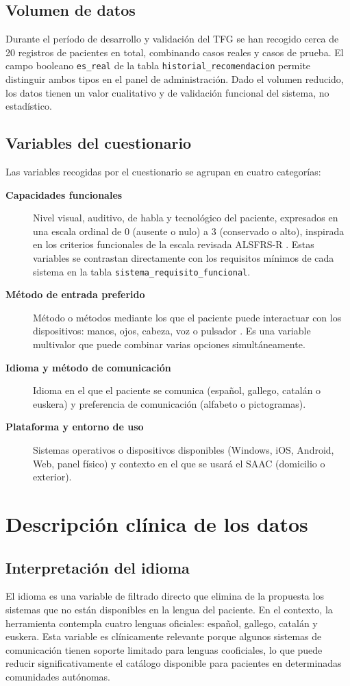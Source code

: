 \subsection{Volumen de datos}
Durante el período de desarrollo y validación del TFG se han recogido cerca de 20 registros de pacientes en total, combinando casos reales y casos de prueba. El campo booleano \texttt{es\_real} de la tabla \texttt{historial\_recomendacion} permite distinguir ambos tipos en el panel de administración. Dado el volumen reducido, los datos tienen un valor cualitativo y de validación funcional del sistema, no estadístico.

\subsection{Variables del cuestionario}
Las variables recogidas por el cuestionario se agrupan en cuatro categorías:

\begin{description}
	\item[\textbf{Capacidades funcionales}] Nivel visual, auditivo, de habla y tecnológico del paciente, expresados en una escala ordinal de 0 (ausente o nulo) a 3 (conservado o alto), inspirada en los criterios funcionales de la escala revisada ALSFRS-R  \cite{cedarbaum:alsfrsr}. Estas 			variables se contrastan directamente con los requisitos mínimos de cada sistema en la tabla \texttt{sistema\_requisito\_funcional}.
	\item[\textbf{Método de entrada preferido}] Método o métodos mediante los que el paciente puede interactuar con los dispositivos: manos, ojos, cabeza, voz o pulsador \cite{iso:9241}. Es una variable multivalor que puede combinar varias opciones simultáneamente.
	\item[\textbf{Idioma y método de comunicación}] Idioma en el que el paciente se comunica (español, gallego, catalán o euskera) y preferencia de comunicación (alfabeto o pictogramas).
	\item[\textbf{Plataforma y entorno de uso}] Sistemas operativos o dispositivos disponibles (Windows, iOS, Android, Web, panel físico) y contexto en el que se usará el SAAC (domicilio o exterior).
\end{description}

\section{Descripción clínica de los datos}

\subsection{Interpretación del idioma}
El idioma es una variable de filtrado directo que elimina de la propuesta los sistemas que no están disponibles en la lengua del paciente. En el contexto, la herramienta contempla cuatro lenguas oficiales: español, gallego, catalán y euskera. Esta variable es clínicamente relevante porque algunos sistemas de comunicación tienen soporte limitado para lenguas cooficiales, lo que puede reducir significativamente el catálogo disponible para pacientes en determinadas comunidades autónomas.

